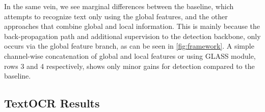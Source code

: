 \documentclass[runningheads]{llncs}
\begin{document}
In the same vein, we see marginal differences between the baseline, which attempts to recognize text only using the global features, and the other approaches that combine global and local information.
This is mainly because the back-propagation path and additional supervision to the detection backbone, only occurs via the global feature branch, as can be seen in \cref{fig:framework}.
A simple channel-wise concatenation of global and local features or using GLASS module, rows 3 and 4 respectively, shows only minor gains for detection compared to the baseline.

\begin{table}[t]
\centering
\caption{\textbf{Ablation study - Detection.} This table complements paper Table 3 with detection results. ``Fusion Type'' stands the fusion operator used when both feature types are included: channel-wise concatenation and our fusion method. }
\label{tab:ablation1_detection}
\end{table} 







\subsection{TextOCR Results}
\end{document}
